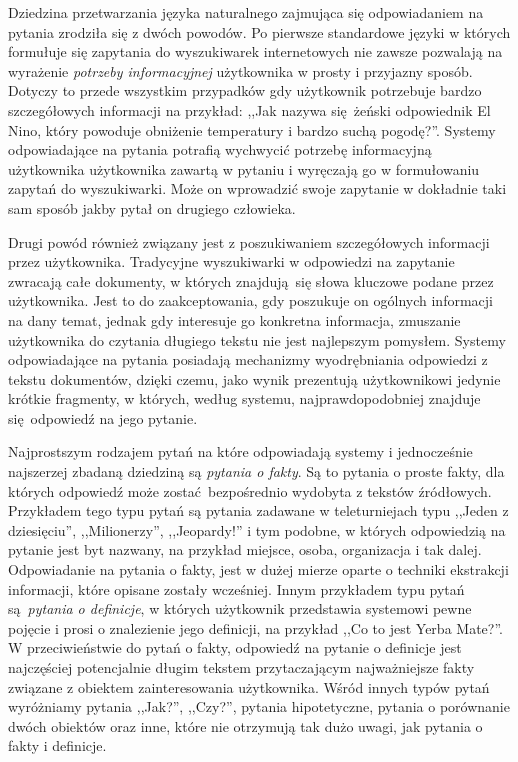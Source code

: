 \documentclass[a4paper, twoside, 12pt]{report}
\begin{document}
            Dziedzina przetwarzania języka naturalnego zajmująca się odpowiadaniem na pytania zrodziła się z dwóch powodów.
            Po pierwsze standardowe języki w których formułuje się zapytania do wyszukiwarek internetowych nie zawsze
            pozwalają na wyrażenie \emph{potrzeby informacyjnej} użytkownika w prosty i przyjazny sposób. Dotyczy to
            przede wszystkim przypadków gdy użytkownik potrzebuje bardzo szczegółowych informacji na przykład:
            ,,Jak nazywa się żeński odpowiednik El Nino, który powoduje obniżenie temperatury i bardzo suchą pogodę?''.
            Systemy odpowiadające na pytania potrafią wychwycić potrzebę informacyjną użytkownika użytkownika zawartą w
            pytaniu i wyręczają go w formułowaniu zapytań do wyszukiwarki. Może on
            wprowadzić swoje zapytanie w dokładnie taki sam sposób jakby pytał on drugiego człowieka.

            Drugi powód również związany jest z poszukiwaniem szczegółowych informacji przez użytkownika. Tradycyjne
            wyszukiwarki w odpowiedzi na zapytanie zwracają całe dokumenty, w których znajdują się słowa kluczowe podane
            przez użytkownika. Jest to do zaakceptowania, gdy poszukuje on ogólnych informacji na dany temat, jednak
            gdy interesuje go konkretna informacja, zmuszanie użytkownika do czytania długiego tekstu nie jest najlepszym
            pomysłem. Systemy odpowiadające na pytania posiadają mechanizmy wyodrębniania odpowiedzi z tekstu dokumentów,
            dzięki czemu, jako wynik prezentują użytkownikowi jedynie krótkie fragmenty, w których, według systemu,
            najprawdopodobniej znajduje się odpowiedź na jego pytanie.

            Najprostszym rodzajem pytań na które odpowiadają
            systemy i jednocześnie najszerzej zbadaną dziedziną są \emph{pytania o fakty}. Są to pytania o proste fakty,
            dla których odpowiedź może zostać bezpośrednio wydobyta z tekstów źródłowych. Przykładem tego typu pytań są
            pytania zadawane w teleturniejach typu ,,Jeden z dziesięciu'', ,,Milionerzy'', ,,Jeopardy!'' i tym podobne,
            w których odpowiedzią na pytanie jest byt nazwany, na przykład miejsce, osoba, organizacja i tak dalej.
            Odpowiadanie na pytania o fakty, jest w dużej mierze oparte o techniki ekstrakcji informacji, które opisane
            zostały wcześniej.
            Innym przykładem typu pytań są \emph{pytania o definicje}, w których użytkownik przedstawia systemowi pewne
            pojęcie i prosi o znalezienie jego definicji, na przykład ,,Co to jest Yerba Mate?''. W przeciwieństwie do
            pytań o fakty, odpowiedź na pytanie o definicje jest najczęściej potencjalnie długim tekstem przytaczającym
            najważniejsze fakty związane z obiektem zainteresowania użytkownika. Wśród innych typów
            pytań wyróżniamy pytania ,,Jak?'', ,,Czy?'', pytania hipotetyczne, pytania o porównanie dwóch obiektów oraz
            inne, które nie otrzymują tak dużo uwagi, jak pytania o fakty i definicje.
\end{document}
